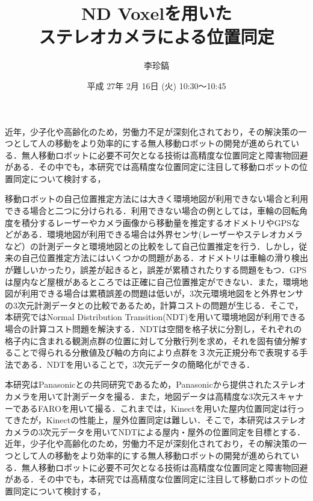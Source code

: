 \title{ND Voxelを用いた\\ステレオカメラによる位置同定}
\author{李珍鎬}
\date{平成 27年 2月 16日 (火) 10:30～10:45}


\maketitle

近年，少子化や高齢化のため，労働力不足が深刻化されており，その解決策の一つとして人の移動をより効率的にする無人移動ロボットの開発が進められている．無人移動ロボットに必要不可欠となる技術は高精度な位置同定と障害物回避がある．その中でも，本研究では高精度な位置同定に注目して移動ロボットの位置同定について検討する，\par
移動ロボットの自己位置推定方法には大きく環境地図が利用できない場合と利用できる場合と二つに分けられる．利用できない場合の例としては，車輪の回転角度を積分するレーザーやカメラ画像から移動量を推定するオドメトリやGPSなどがある．環境地図が利用できる場合は外界センサ(レーザーやステレオカメラなど）の計測データと環境地図との比較をして自己位置推定を行う．しかし，従来の自己位置推定方法にはいくつかの問題がある．オドメトリは車輪の滑り検出が難しいかったり，誤差が起きると，誤差が累積されたりする問題をもつ．GPSは屋内など屋根があるところでは正確に自己位置推定ができない．また，環境地図が利用できる場合は累積誤差の問題は低いが，3次元環境地図をと外界センサの3次元計測データとの比較であるため，計算コストの問題が生じる．そこで，本研究ではNormal Distribution Transition(NDT)を用いて環境地図が利用できる場合の計算コスト問題を解決する．NDTは空間を格子状に分割し，それぞれの格子内に含まれる観測点群の位置に対して分散行列を求め，それを固有値分解することで得られる分散値及び軸の方向により点群を３次元正規分布で表現する手法である．NDTを用いることで，3次元データの簡略化ができる．\par
本研究はPanasonicとの共同研究であるため，Panasonicから提供されたステレオカメラを用いて計測データを撮る．また，地図データは高精度な3次元スキャナーであるFAROを用いて撮る．これまでは，Kinectを用いた屋内位置同定は行ってきたが，Kinectの性能上，屋外位置同定は難しい．そこで，本研究はステレオカメラの3次元データを用いてNDTによる屋内・屋外の位置同定を目標とする．
\fi
{}
近年，少子化や高齢化のため，労働力不足が深刻化されており，その解決策の一つとして人の移動をより効率的にする無人移動ロボットの開発が進められている．無人移動ロボットに必要不可欠となる技術は高精度な位置同定と障害物回避がある．その中でも，本研究では高精度な位置同定に注目して移動ロボットの位置同定について検討する，\par
